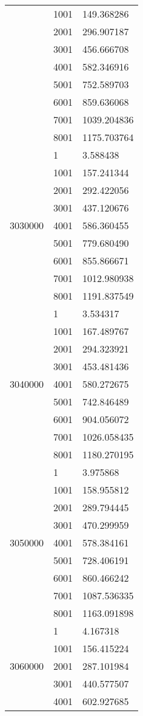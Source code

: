 \begin{table}[htb!]
\begin{tabular}{lll}
 & 1001 & 149.368286 \\
 & 2001 & 296.907187 \\
 & 3001 & 456.666708 \\
 & 4001 & 582.346916 \\
 & 5001 & 752.589703 \\
 & 6001 & 859.636068 \\
 & 7001 & 1039.204836 \\
 & 8001 & 1175.703764 \\
\multirow[c]{9}{*}{3030000} & 1 & 3.588438 \\
 & 1001 & 157.241344 \\
 & 2001 & 292.422056 \\
 & 3001 & 437.120676 \\
 & 4001 & 586.360455 \\
 & 5001 & 779.680490 \\
 & 6001 & 855.866671 \\
 & 7001 & 1012.980938 \\
 & 8001 & 1191.837549 \\
\multirow[c]{9}{*}{3040000} & 1 & 3.534317 \\
 & 1001 & 167.489767 \\
 & 2001 & 294.323921 \\
 & 3001 & 453.481436 \\
 & 4001 & 580.272675 \\
 & 5001 & 742.846489 \\
 & 6001 & 904.056072 \\
 & 7001 & 1026.058435 \\
 & 8001 & 1180.270195 \\
\multirow[c]{9}{*}{3050000} & 1 & 3.975868 \\
 & 1001 & 158.955812 \\
 & 2001 & 289.794445 \\
 & 3001 & 470.299959 \\
 & 4001 & 578.384161 \\
 & 5001 & 728.406191 \\
 & 6001 & 860.466242 \\
 & 7001 & 1087.536335 \\
 & 8001 & 1163.091898 \\
\multirow[c]{9}{*}{3060000} & 1 & 4.167318 \\
 & 1001 & 156.415224 \\
 & 2001 & 287.101984 \\
 & 3001 & 440.577507 \\
 & 4001 & 602.927685 \\

\end{tabular}
\end{table}
